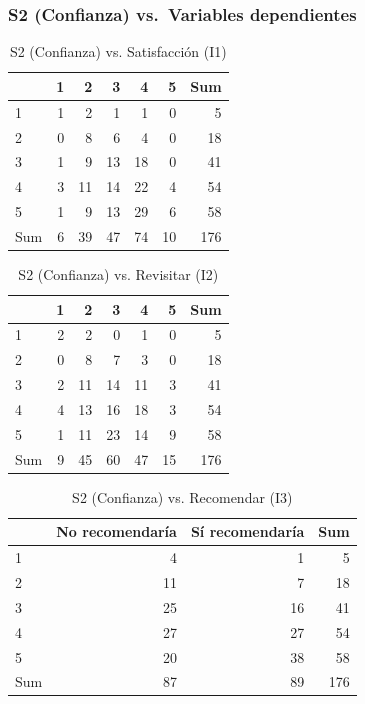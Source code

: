 \documentclass[
  spanish,
]{article}
\begin{document}
\subsubsection{S2 (Confianza) vs.~Variables
dependientes}\label{s2-confianza-vs.-variables-dependientes}

\begin{longtable}[t]{lrrrrrr}
\caption{\label{tab:cont-s2-satisf}S2 (Confianza) vs. Satisfacción (I1)}\\
\toprule
 & 1 & 2 & 3 & 4 & 5 & Sum\\
\midrule
1 & 1 & 2 & 1 & 1 & 0 & 5\\
2 & 0 & 8 & 6 & 4 & 0 & 18\\
3 & 1 & 9 & 13 & 18 & 0 & 41\\
4 & 3 & 11 & 14 & 22 & 4 & 54\\
5 & 1 & 9 & 13 & 29 & 6 & 58\\
\addlinespace
Sum & 6 & 39 & 47 & 74 & 10 & 176\\
\bottomrule
\end{longtable}

\begin{longtable}[t]{lrrrrrr}
\caption{\label{tab:cont-s2-revis}S2 (Confianza) vs. Revisitar (I2)}\\
\toprule
 & 1 & 2 & 3 & 4 & 5 & Sum\\
\midrule
1 & 2 & 2 & 0 & 1 & 0 & 5\\
2 & 0 & 8 & 7 & 3 & 0 & 18\\
3 & 2 & 11 & 14 & 11 & 3 & 41\\
4 & 4 & 13 & 16 & 18 & 3 & 54\\
5 & 1 & 11 & 23 & 14 & 9 & 58\\
\addlinespace
Sum & 9 & 45 & 60 & 47 & 15 & 176\\
\bottomrule
\end{longtable}

\begin{longtable}[t]{lrrr}
\caption{\label{tab:cont-s2-recom}S2 (Confianza) vs. Recomendar (I3)}\\
\toprule
 & No recomendaría & Sí recomendaría & Sum\\
\midrule
1 & 4 & 1 & 5\\
2 & 11 & 7 & 18\\
3 & 25 & 16 & 41\\
4 & 27 & 27 & 54\\
5 & 20 & 38 & 58\\
\addlinespace
Sum & 87 & 89 & 176\\
\bottomrule
\end{longtable}
\end{document}
